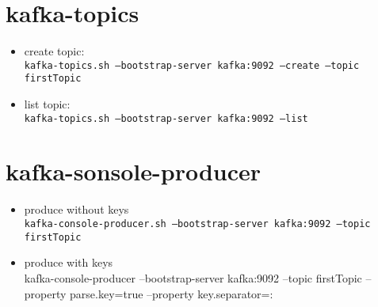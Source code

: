 \documentclass{article}
\begin{document}
\section{kafka-topics}
\begin{itemize}
\item create topic: \\
\texttt{kafka-topics.sh --bootstrap-server kafka:9092 --create --topic firstTopic}
\item list topic: \\
\texttt{kafka-topics.sh --bootstrap-server kafka:9092 --list}
\end{itemize}
\section{kafka-sonsole-producer}
\begin{itemize}
\item produce without keys\\
\texttt{kafka-console-producer.sh --bootstrap-server kafka:9092 --topic firstTopic}
\item produce with keys\\
kafka-console-producer --bootstrap-server kafka:9092 --topic firstTopic --property parse.key=true --property key.separator=:
\end{itemize}
\end{document}
